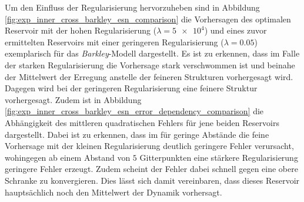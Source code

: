 Um den Einfluss der Regularisierung hervorzuheben sind in Abbildung \ref{fig:exp_inner_cross_barkley_esn_comparison} die Vorhersagen des optimalen Reservoir mit der hohen Regularisierung ($\lambda=\num{5e4}$) und eines zuvor ermittelten Reservoirs mit einer geringeren Regularisierung ($\lambda=0.05$) exemplarisch für das \textit{Barkley}-Modell dargestellt. Es ist zu erkennen, dass im Falle der starken Regularisierung die Vorhersage stark verschwommen ist und beinahe der Mittelwert der Erregung anstelle der feineren Strukturen vorhergesagt wird. Dagegen wird bei der geringeren Regularisierung eine feinere Struktur vorhergesagt. 
Zudem ist in Abbildung \ref{fig:exp_inner_cross_barkley_esn_error_dependency_comparison} die Abhängigkeit des mittleren quadratischen Fehlers für jene beiden Reservoirs dargestellt. Dabei ist zu erkennen, dass im für geringe Abstände die feine Vorhersage mit der kleinen Regularisierung deutlich geringere Fehler verursacht, wohingegen ab einem Abstand von $5$ Gitterpunkten eine stärkere Regularisierung geringere Fehler erzeugt. Zudem scheint der Fehler dabei schnell gegen eine obere Schranke zu konvergieren. Dies lässt sich damit vereinbaren, dass dieses Reservoir hauptsächlich noch den Mittelwert der Dynamik vorhersagt.

